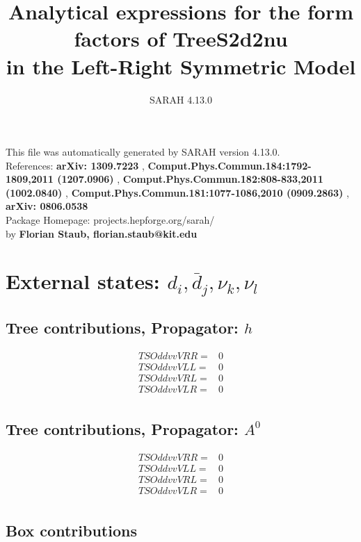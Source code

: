 \documentclass[A4,landscape]{article}
\begin{document}
\title{Analytical expressions for the form factors of TreeS2d2nu\\ in the Left-Right Symmetric Model } 
 \author{SARAH 4.13.0} 
 \maketitle 
 \vspace{10cm} 
This file was automatically generated by SARAH version 4.13.0.  \\ 
References: {\bf arXiv: 1309.7223 }, {\bf Comput.Phys.Commun.184:1792-1809,2011 (1207.0906) }, {\bf Comput.Phys.Commun.182:808-833,2011 (1002.0840) }, {\bf Comput.Phys.Commun.181:1077-1086,2010 (0909.2863) }, {\bf arXiv: 0806.0538 } \\ 
Package Homepage: projects.hepforge.org/sarah/ \\ 
by {\bf Florian Staub, florian.staub@kit.edu} 
 \pagebreak 
 \tableofcontents 
 \pagebreak 
\section{External states: ${d_{{i}}, \bar{d}_{{j}}, \nu_{{k}}, \nu_{{l}}}$} 
\subsection{Tree contributions, Propagator: $h$} 

\begin{align} 
  TSOddvvVRR= & 0 \\ 
  TSOddvvVLL= & 0 \\ 
  TSOddvvVRL= & 0 \\ 
  TSOddvvVLR= & 0 \\ 
\end{align} 
\subsection{Tree contributions, Propagator: $A^0$} 

\begin{align} 
  TSOddvvVRR= & 0 \\ 
  TSOddvvVLL= & 0 \\ 
  TSOddvvVRL= & 0 \\ 
  TSOddvvVLR= & 0 \\ 
\end{align} 
\subsection{Box contributions} 
\end{document}

